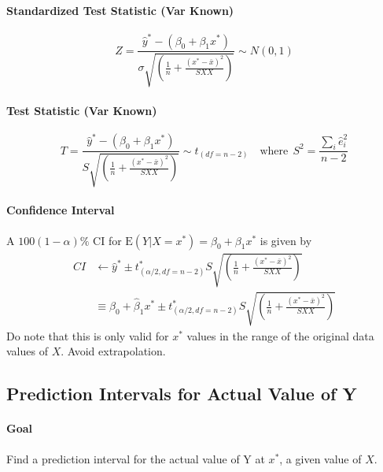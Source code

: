 \documentclass[11pt]{article}
\begin{document}
\paragraph{Standardized Test Statistic (Var Known)}
\begin{equation*}
    Z=\frac{\hat{y}^{*}-\left(\beta_{0}+\beta_{1} x^{*}\right)}{\sigma \sqrt{\left(\frac{1}{n}+\frac{\left(x^{*}-\bar{x}\right)^{2}}{S X X}\right)}} \sim N(0,1)
\end{equation*}

\paragraph{Test Statistic (Var Known)}
\begin{equation*}
    T=\frac{\hat{y}^*-\left(\beta_{0}+\beta_{1} x^{*}\right)}{S \sqrt{\left(\frac{1}{n}+\frac{\left(x^{*}-\bar{x}\right)^{2}}{S X X}\right)}} \sim t_{(df=n-2)} \quad \text{where}~~S^2 = \frac{\sum_i \hat{e}_i^2}{n-2} 
\end{equation*}

\paragraph{Confidence Interval} A $100 (1 - \alpha) \%$ CI for $\mathrm{E}\left(Y | X=x^{*}\right)=\beta_{0}+\beta_{1} x^{*}$ is given by
\begin{align*}
    CI &\gets \hat{y}^{*} \pm t^\ast_{(\alpha / 2, df = n-2)} S \sqrt{\left(\frac{1}{n}+\frac{\left(x^{*}-\bar{x}\right)^{2}}{S X X}\right)} \\
    &\equiv \hat{\beta}_{0}+\hat{\beta}_{1} x^{*} \pm t^\ast_{(\alpha / 2, df =n-2)} S \sqrt{\left(\frac{1}{n}+\frac{\left(x^{*}-\bar{x}\right)^{2}}{S X X}\right)}
\end{align*}
\color{Thistle} 
Do note that this is only valid for $x^\ast$ values in the range of the original data values of $X$. Avoid extrapolation.
\color{Black}

\subsection{Prediction Intervals for Actual Value of Y}
\paragraph{Goal} Find a prediction interval for the actual value of Y at $x^*$, a given value of $X$.
\end{document}
